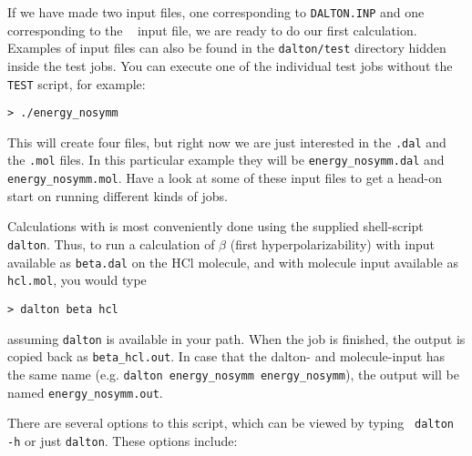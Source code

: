 If we have made two input files, one corresponding to
\verb|DALTON.INP| and one corresponding to the \mol\
 input file, we
are ready to do our first calculation. Examples of input files can
also be found in the \verb|dalton/test| directory hidden inside the
test jobs. You can execute one of the individual test jobs
without the \verb|TEST| script, for example:
\begin{verbatim}
> ./energy_nosymm
\end{verbatim}
This will create four files, but right now we are just interested in
the \verb|.dal| and the \verb|.mol| files. In this particular example
they will be \verb|energy_nosymm.dal| and
\verb|energy_nosymm.mol|. Have a look at some of these input files to
get a head-on start on running different kinds of {\dalton} jobs.

Calculations with {\dalton} is most conveniently done using the
supplied shell-script \verb|dalton|. Thus,
to run a calculation of $\beta$ (first
hyperpolarizability) 
with input available as \verb|beta.dal| on the HCl molecule, and with
molecule input available as \verb|hcl.mol|, you would type

\begin{verbatim}
> dalton beta hcl
\end{verbatim}
assuming \verb|dalton| is available in your path. When the job is
finished, the output is copied back as \verb|beta_hcl.out|. In case that the
dalton- and molecule-input has the same name (e.g.
\verb|dalton energy_nosymm energy_nosymm|), the output will be named
\verb|energy_nosymm.out|.

There are several options to this script, which can be viewed by
typing \verb| dalton -h| or just \verb|dalton|. These options include:

